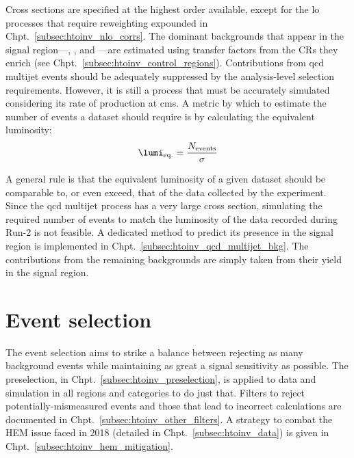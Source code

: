 \medskip
\noindent{}Cross sections are specified at the highest order available, except for the \acrshort{lo} processes that require reweighting expounded in Chpt.~\ref{subsec:htoinv_nlo_corrs}. The dominant backgrounds that appear in the signal region---\ttbarpjets, \wtolnupjets, and \ztonunupjets---are estimated using transfer factors from the \glspl{CR} they enrich (see Chpt.~\ref{subsec:htoinv_control_regions}). Contributions from \acrshort{qcd} multijet events should be adequately suppressed by the analysis-level selection requirements. However, it is still a process that must be accurately simulated considering its rate of production at \acrshort{cms}. A metric by which to estimate the number of events a dataset should require is by calculating the equivalent luminosity:
\begin{equation}
    \lumi_{\mathrm{eq.}} = \frac{N_{\mathrm{events}}}{\sigma}
    \label{eq:equivalent_lumi}
\end{equation}

A general rule is that the equivalent luminosity of a given dataset should be comparable to, or even exceed, that of the data collected by the experiment. Since the \acrshort{qcd} multijet process has a very large cross section, simulating the required number of events to match the luminosity of the data recorded during Run-2 is not feasible. A dedicated method to predict its presence in the signal region is implemented in Chpt.~\ref{subsec:htoinv_qcd_multijet_bkg}. The contributions from the remaining backgrounds are simply taken from their yield in the signal region.




\section{Event selection}
\label{sec:htoinv_event_selection}

The event selection aims to strike a balance between rejecting as many background events while maintaining as great a signal sensitivity as possible. The preselection, in Chpt.~\ref{subsec:htoinv_preselection}, is applied to data and simulation in all regions and categories to do just that. Filters to reject potentially-mismeasured events and those that lead to incorrect \ptmiss calculations are documented in Chpt.~\ref{subsec:htoinv_other_filters}. A strategy to combat the HEM issue faced in 2018 (detailed in Chpt.~\ref{subsec:htoinv_data}) is given in Chpt.~\ref{subsec:htoinv_hem_mitigation}.

